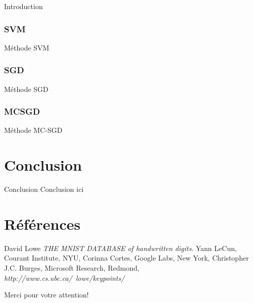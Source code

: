 \documentclass[11pt]{beamer}
\begin{document}
\begin{otherlanguage}{french}
\begin{frame}{Introduction}
\end{frame}

\subsubsection{SVM}
\begin{frame}{Méthode SVM}

\end{frame}

\subsubsection{SGD}
\begin{frame}{Méthode SGD}

\end{frame}

\subsubsection{MCSGD}
\begin{frame}{Méthode MC-SGD}

\end{frame}

\section{Conclusion}
\begin{frame}{Conclusion}
Conclusion ici
\end{frame}

\end{otherlanguage}

\section*{Références}

\begin{frame}
\begin{thebibliography}{9}
  David Lowe
  \emph{THE MNIST DATABASE of handwritten digits}.
  Yann LeCun, Courant Institute, NYU,
  Corinna Cortes, Google Labs, New York,
  Christopher J.C. Burges, Microsoft Research, Redmond,
  \emph{http://www.cs.ubc.ca/~lowe/keypoints/}
   
 
\end{thebibliography}
\end{frame}
\begin{frame}
 \Huge Merci pour votre attention!
\end{frame}
\end{document}
